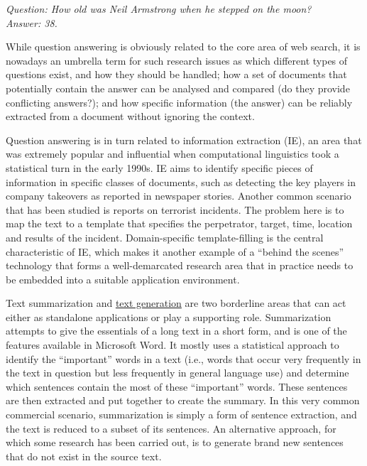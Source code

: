 \documentclass[]{../../metanetpaper}
\begin{document}
\begin{multicols}{2}
\textit{Question: How old was Neil Armstrong when he stepped on the moon?}\\
\textit{Answer: 38.}

While question answering is obviously related to the core area of web search, it is nowadays an umbrella term for such research issues as which different types of questions exist, and how they should be handled; how a set of documents that potentially contain the answer can be analysed and compared (do they provide conflicting answers?); and how specific information (the answer) can be reliably extracted from a document without ignoring the context. 



Question answering is in turn related to information extraction (IE), an area that was extremely popular and influential when computational linguistics took a statistical turn in the early 1990s. IE aims to identify specific pieces of information in specific classes of documents, such as detecting the key players in company takeovers as reported in newspaper stories. Another common scenario that has been studied is reports on terrorist incidents. The problem here is to map the text to a template that specifies the perpetrator, target, time, location and results of the incident. Domain-specific template-filling is the central characteristic of IE, which makes it another example of a “behind the scenes” technology that forms a well-demarcated research area that in practice needs to be embedded into a suitable application environment.

Text summarization and \underline{text generation} are two borderline areas
that can act either as standalone applications or play a supporting
role. Summarization attempts to give the essentials of a long text in a short
form, and is one of the features available in Microsoft Word. It mostly uses a
statistical approach to identify the “important” words in a text (i.e.,
words that occur very frequently in the text in question but less frequently
in general language use) and determine which sentences contain the most of
these “important” words. These sentences are then extracted and put together to create the summary. In this very common commercial scenario, summarization is simply a form of sentence extraction, and the text is reduced to a subset of its sentences. An alternative approach, for which some research has been carried out, is to generate brand new sentences that do not exist in the source text. 


\end{multicols}
\end{document}
